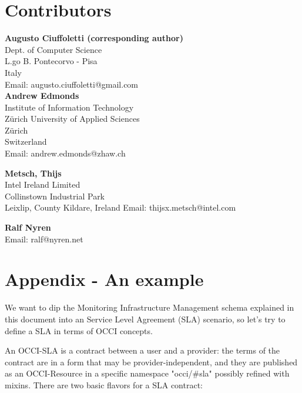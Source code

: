 \documentclass[12pt]{article}  %
\begin{document}




\section{Contributors}

\textbf{Augusto Ciuffoletti (corresponding author)} \\
Dept. of Computer Science \\
L.go B. Pontecorvo - Pisa\\
Italy \\
Email: augusto.ciuffoletti@gmail.com \\

\textbf{Andrew Edmonds}\\
Institute of Information Technology \\
Zürich University of Applied Sciences \\
Zürich \\
Switzerland \\
Email: andrew.edmonds@zhaw.ch

\textbf{Metsch, Thijs} \\
Intel Ireland Limited \\
Collinstown Industrial Park \\
Leixlip, County Kildare, Ireland
Email: thijsx.metsch@intel.com

\textbf{Ralf Nyren} \\
Email: ralf@nyren.net 



\appendix

\section*{Appendix - An example}

We want to dip the Monitoring Infrastructure Management schema explained in this document into an Service Level Agreement (SLA) scenario, so let's try to define a SLA in terms of OCCI concepts.

An OCCI-SLA is a contract between a user and a provider: the terms of the contract are in a form that may be provider-independent, and they are published as an OCCI-Resource in a specific namespace "occi/\#sla" possibly refined with mixins. There are two basic flavors for a SLA contract:
\end{document}
